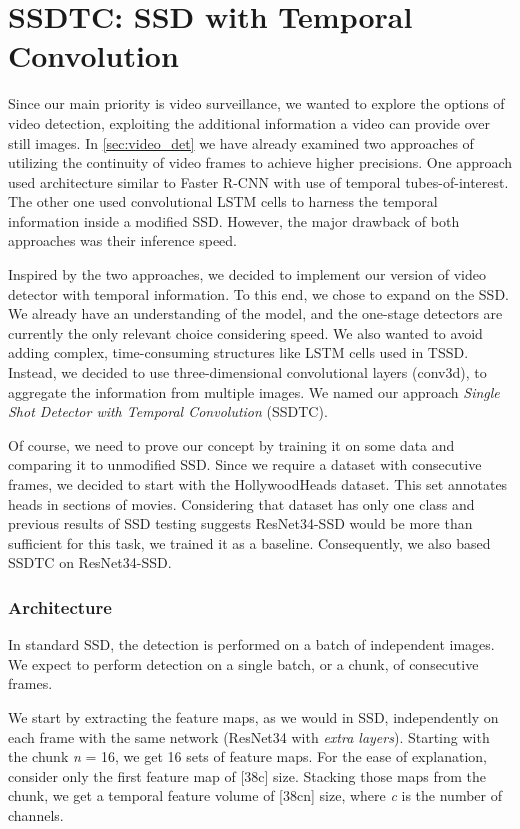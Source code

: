 \section{SSDTC: SSD with Temporal Convolution}
\label{sec:ssdtc}
Since our main priority is video surveillance, we wanted to explore the options of video detection, exploiting the additional information a video can provide over still images. In \cref{sec:video_det} we have already examined two approaches of utilizing the continuity of video frames to achieve higher precisions. One approach used architecture similar to Faster R-CNN with use of temporal tubes-of-interest. The other one used convolutional LSTM cells to harness the temporal information inside a modified SSD. However, the major drawback of both approaches was their inference speed. 

Inspired by the two approaches, we decided to implement our version of video detector with temporal information. To this end, we chose to expand on the SSD. We already have an understanding of the model, and the one-stage detectors are currently the only relevant choice considering speed. We also wanted to avoid adding complex, time-consuming structures like LSTM cells used in TSSD. Instead, we decided to use three-dimensional convolutional layers (conv3d), to aggregate the information from multiple images. We named our approach \textit{Single Shot Detector with Temporal Convolution} (SSDTC).

Of course, we need to prove our concept by training it on some data and comparing it to unmodified SSD. Since we require a dataset with consecutive frames, we decided to start with the HollywoodHeads dataset. This set annotates heads in sections of movies. Considering that dataset has only one class and previous results of SSD testing suggests ResNet34-SSD would be more than sufficient for this task, we trained it as a baseline. Consequently, we also based SSDTC on ResNet34-SSD.

\subsubsection{Architecture}
In standard SSD, the detection is performed on a batch of independent images. We expect to perform detection on a single batch, or a chunk, of consecutive frames. 

We start by extracting the feature maps, as we would in SSD, independently on each frame with the same network (ResNet34 with \textit{extra layers}). Starting with the chunk \textit{n} = 16, we get 16 sets of feature maps. For the ease of explanation, consider only the first feature map of [38\x c] size. Stacking those maps from the chunk, we get a temporal feature volume of [38\x c\x n] size, where \textit{c} is the number of channels. 

